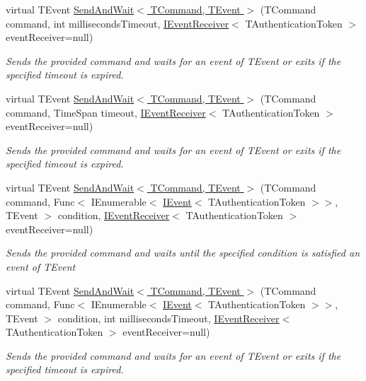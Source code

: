 \begin{DoxyCompactItemize}
virtual T\+Event \hyperlink{classCqrs_1_1Bus_1_1InProcessBus_a1b3540fe06b60cd601eaff4ea53f5465}{Send\+And\+Wait$<$ T\+Command, T\+Event $>$} (T\+Command command, int milliseconds\+Timeout, \hyperlink{interfaceCqrs_1_1Events_1_1IEventReceiver}{I\+Event\+Receiver}$<$ T\+Authentication\+Token $>$ event\+Receiver=null)
\begin{DoxyCompactList}\small\item\em Sends the provided {\itshape command}  and waits for an event of {\itshape T\+Event}  or exits if the specified timeout is expired. \end{DoxyCompactList}\item 
virtual T\+Event \hyperlink{classCqrs_1_1Bus_1_1InProcessBus_a6d49efcd657ed029f97fac292e6296b0}{Send\+And\+Wait$<$ T\+Command, T\+Event $>$} (T\+Command command, Time\+Span timeout, \hyperlink{interfaceCqrs_1_1Events_1_1IEventReceiver}{I\+Event\+Receiver}$<$ T\+Authentication\+Token $>$ event\+Receiver=null)
\begin{DoxyCompactList}\small\item\em Sends the provided {\itshape command}  and waits for an event of {\itshape T\+Event}  or exits if the specified timeout is expired. \end{DoxyCompactList}\item 
virtual T\+Event \hyperlink{classCqrs_1_1Bus_1_1InProcessBus_ac8c4a77edc761f15e16c638624424443}{Send\+And\+Wait$<$ T\+Command, T\+Event $>$} (T\+Command command, Func$<$ I\+Enumerable$<$ \hyperlink{interfaceCqrs_1_1Events_1_1IEvent}{I\+Event}$<$ T\+Authentication\+Token $>$$>$, T\+Event $>$ condition, \hyperlink{interfaceCqrs_1_1Events_1_1IEventReceiver}{I\+Event\+Receiver}$<$ T\+Authentication\+Token $>$ event\+Receiver=null)
\begin{DoxyCompactList}\small\item\em Sends the provided {\itshape command}  and waits until the specified condition is satisfied an event of {\itshape T\+Event}  \end{DoxyCompactList}\item 
virtual T\+Event \hyperlink{classCqrs_1_1Bus_1_1InProcessBus_af3ed033471e85b2943a470c1a635f9c4}{Send\+And\+Wait$<$ T\+Command, T\+Event $>$} (T\+Command command, Func$<$ I\+Enumerable$<$ \hyperlink{interfaceCqrs_1_1Events_1_1IEvent}{I\+Event}$<$ T\+Authentication\+Token $>$$>$, T\+Event $>$ condition, int milliseconds\+Timeout, \hyperlink{interfaceCqrs_1_1Events_1_1IEventReceiver}{I\+Event\+Receiver}$<$ T\+Authentication\+Token $>$ event\+Receiver=null)
\begin{DoxyCompactList}\small\item\em Sends the provided {\itshape command}  and waits for an event of {\itshape T\+Event}  or exits if the specified timeout is expired. \end{DoxyCompactList}\item 

\end{DoxyCompactItemize}
